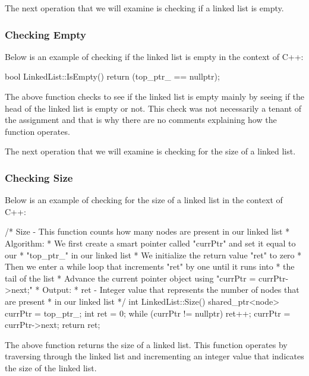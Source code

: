 The next operation that we will examine is checking if a linked list is empty.

\begin{highlight}

\subsubsection*{Checking Empty}

Below is an example of checking if the linked list is empty in the context of C++:

\begin{code}
bool LinkedList::IsEmpty() {
    return (top_ptr_ == nullptr);
}      
\end{code}

The above function checks to see if the linked list is empty mainly by seeing if the head of the linked list is empty or not. This check was not necessarily a tenant of the assignment and that is
why there are no comments explaining how the function operates.

\end{highlight}

The next operation that we will examine is checking for the size of a linked list.

\begin{highlight}

\subsubsection*{Checking Size}

Below is an example of checking for the size of a linked list in the context of C++:

\begin{code}
/*  Size - This function counts how many nodes are present in our linked list
*   Algorithm:
*     We first create a smart pointer called "currPtr" and set it equal to our 
*     "top_ptr_" in our linked list
*     We initialize the return value "ret" to zero
*     Then we enter a while loop that increments "ret" by one until it runs into 
*     the tail of the list
*     Advance the current pointer object using "currPtr = currPtr->next;"
*   Output:
*     ret - Integer value that represents the number of nodes that are present 
*     in our linked list
*/
int LinkedList::Size(){
    shared_ptr<node> currPtr = top_ptr_;
    int ret = 0;
    while (currPtr != nullptr) {
        ret++;
        currPtr = currPtr->next;
    }
    return ret;
}
\end{code}

The above function returns the size of a linked list. This function operates by traversing through the linked list and incrementing an integer value that indicates the size of the linked list.

\end{highlight}

